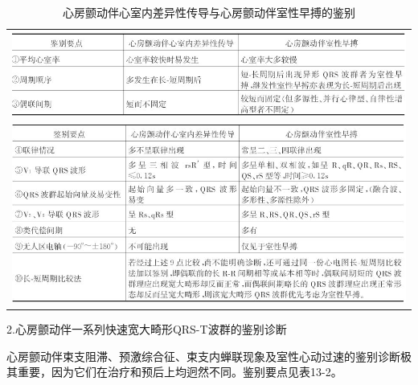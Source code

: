 \begin{longtable}{c}
  \caption{心房颤动伴心室内差异性传导与心房颤动伴室性早搏的鉴别}
  \label{tab13-1}\\
  \endfirsthead
  \caption[]{心房颤动伴心室内差异性传导与心房颤动伴室性早搏的鉴别}
  \endhead
\includegraphics[width=\textwidth,height=\textheight,keepaspectratio]{./images/Image00239.jpg}\\
\includegraphics[width=\textwidth,height=\textheight,keepaspectratio]{./images/Image00240.jpg}
\end{longtable}

2.心房颤动伴一系列快速宽大畸形QRS-T波群的鉴别诊断

心房颤动伴束支阻滞、预激综合征、束支内蝉联现象及室性心动过速的鉴别诊断极其重要，因为它们在治疗和预后上均迥然不同。鉴别要点见表13-2。


